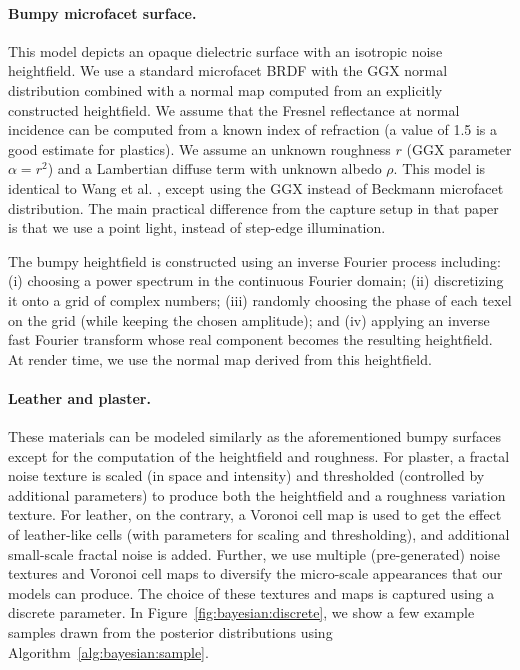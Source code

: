 \paragraph{Bumpy microfacet surface.}
This model depicts an opaque dielectric surface with an isotropic noise heightfield. We use a standard microfacet BRDF with the GGX normal distribution \cite{walter2007microfacet} combined with a normal map computed from an explicitly constructed heightfield. We assume that the Fresnel reflectance at normal incidence can be computed from a known index of refraction (a value of 1.5 is a good estimate for plastics). We assume an unknown roughness $r$ (GGX parameter $\alpha=r^2$) and a Lambertian diffuse term with unknown albedo $\rho$. This model is identical to Wang et al. \cite{wang2011estimating}, except using the GGX instead of Beckmann microfacet distribution. The main practical difference from the capture setup in that paper is that we use a point light, instead of step-edge illumination.

The bumpy heightfield is constructed using an inverse Fourier process including: (i) choosing a power spectrum in the continuous Fourier domain; (ii) discretizing it onto a grid of complex numbers; (iii) randomly choosing the phase of each texel on the grid (while keeping the chosen amplitude); and (iv) applying an inverse fast Fourier transform whose
real component becomes the resulting heightfield.
At render time, we use the normal map derived from this heightfield.

\paragraph{Leather and plaster.}
These materials can be modeled similarly as the aforementioned bumpy surfaces except for the computation of the heightfield and roughness.
For plaster, a fractal noise texture is scaled (in space and intensity) and thresholded (controlled by additional parameters) to produce both the heightfield and a roughness variation texture. For leather, on the contrary, a Voronoi cell map is used to get the effect of leather-like cells (with parameters for scaling and thresholding), and additional small-scale fractal noise is added.
Further, we use multiple (pre-generated) noise textures and Voronoi cell maps to diversify the micro-scale appearances that our models can produce.
The choice of these textures and maps is captured using a discrete parameter.
In Figure~\ref{fig:bayesian:discrete}, we show a few example samples drawn from the posterior distributions using Algorithm~\ref{alg:bayesian:sample}.

